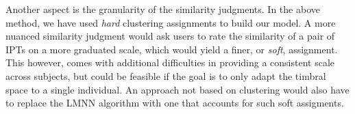 \documentclass{bmcart}
\begin{document}
Another aspect is the granularity of the similarity judgments.
In the above method, we have used \emph{hard} clustering assignments to build our model.
A more nuanced similarity judgment would ask users to rate the similarity of a pair of IPTs on a more graduated scale, which would yield a finer, or \emph{soft}, assignment.
This however, comes with additional difficulties in providing a consistent scale across subjects, but could be feasible if the goal is to only adapt the timbral space to a single individual.
An approach not based on clustering would also have to replace the LMNN algorithm with one that accounts for such soft assigments.







\end{document}
